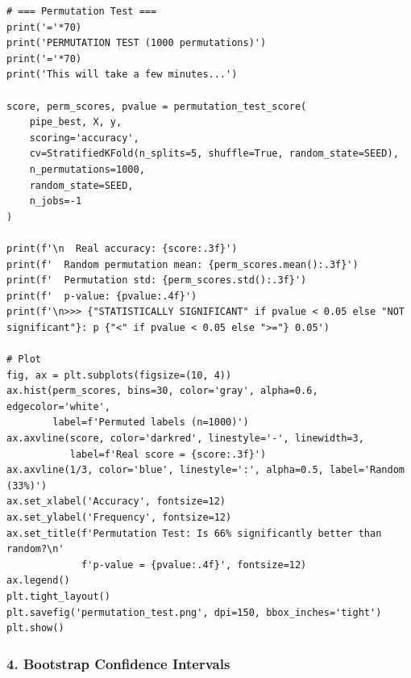 \begin{lstlisting}
# === Permutation Test ===
print('='*70)
print('PERMUTATION TEST (1000 permutations)')
print('='*70)
print('This will take a few minutes...')
 
score, perm_scores, pvalue = permutation_test_score(
    pipe_best, X, y,
    scoring='accuracy',
    cv=StratifiedKFold(n_splits=5, shuffle=True, random_state=SEED),
    n_permutations=1000,
    random_state=SEED,
    n_jobs=-1
)
 
print(f'\n  Real accuracy: {score:.3f}')
print(f'  Random permutation mean: {perm_scores.mean():.3f}')
print(f'  Permutation std: {perm_scores.std():.3f}')
print(f'  p-value: {pvalue:.4f}')
print(f'\n>>> {"STATISTICALLY SIGNIFICANT" if pvalue < 0.05 else "NOT significant"}: p {"<" if pvalue < 0.05 else ">="} 0.05')
 
# Plot
fig, ax = plt.subplots(figsize=(10, 4))
ax.hist(perm_scores, bins=30, color='gray', alpha=0.6, edgecolor='white',
        label=f'Permuted labels (n=1000)')
ax.axvline(score, color='darkred', linestyle='-', linewidth=3,
           label=f'Real score = {score:.3f}')
ax.axvline(1/3, color='blue', linestyle=':', alpha=0.5, label='Random (33%)')
ax.set_xlabel('Accuracy', fontsize=12)
ax.set_ylabel('Frequency', fontsize=12)
ax.set_title(f'Permutation Test: Is 66% significantly better than random?\n'
             f'p-value = {pvalue:.4f}', fontsize=12)
ax.legend()
plt.tight_layout()
plt.savefig('permutation_test.png', dpi=150, bbox_inches='tight')
plt.show()
\end{lstlisting}
 
\subsubsection*{4. Bootstrap Confidence Intervals}
 
